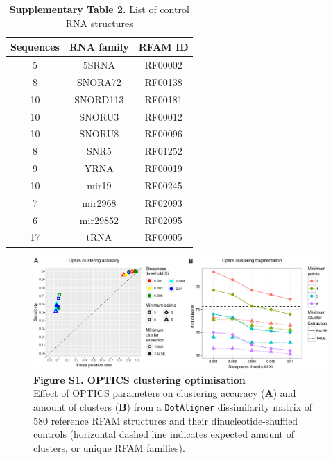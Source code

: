 \documentclass[a4paper,11pt]{article}
\newcommand\dotaligner{\texttt{DotAligner}}
\begin{document}
\begin{table}
\centering
\caption*{\textbf{Supplementary Table 2.}  List of control RNA structures }
\begin{tabular}{ccc}
\hline
Sequences & RNA family & RFAM ID \\
\hline
   5 & 5SRNA & RF00002 \\
   8 & SNORA72 & RF00138 \\
  10 & SNORD113 & RF00181\\
  10 & SNORU3 & RF00012\\
  10 & SNORU8 & RF00096\\
   8 & SNR5 & RF01252\\
   9 & YRNA & RF00019\\
  10 & mir19 & RF00245\\
   7 & mir2968 & RF02093\\
   6 & mir29852 & RF02095\\
  17 & tRNA & RF00005\\
\hline
\end{tabular}
\end{table}

\begin{figure}
 \includegraphics[width=\textwidth]{SF1}
 \caption*{ \textbf{ Figure S1. OPTICS clustering optimisation }\\
Effect of OPTICS parameters on clustering accuracy (\textbf{A}) and amount 
 of clusters (\textbf{B}) from a \dotaligner{} dissimilarity matrix of 580 reference RFAM 
 structures and their dinucleotide-shuffled controls (horizontal dashed line indicates 
 expected amount of clusters, or unique RFAM families). }
\end{figure}
\end{document}
